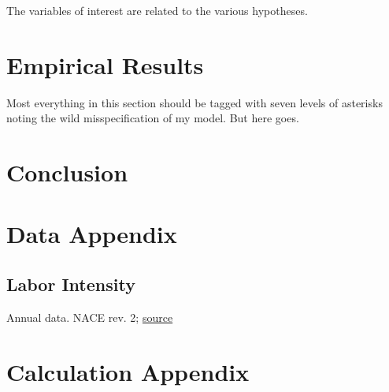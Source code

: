 \documentclass[11pt]{article}
\begin{document}
  The variables of interest are related to the various hypotheses.   

\section{Empirical Results} %
\label{sec:empirical_results}
  Most everything in this section should be tagged with seven levels of asterisks noting the wild misspecification of my model.  But here goes.

  
\section{Conclusion}
\label{sec:conclusion}

\section{Data Appendix}
\label{sec:data_appendix}

\subsection{Labor Intensity} %
\label{sub:labor_intensity}

Annual data.  NACE rev. 2; \href{http://appsso.eurostat.ec.europa.eu/nui/show.do?dataset=sts_inlb_a&lang=en}{source}

\section{Calculation Appendix}
\label{sec:calculation_appendix}





\end{document}
